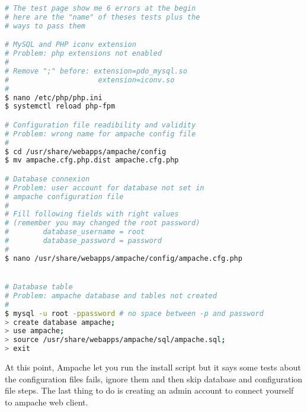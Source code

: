 \begin{lstlisting}[language=bash,caption=Ampache setup]
# The test page show me 6 errors at the begin
# here are the "name" of theses tests plus the 
# ways to pass them

# MySQL and PHP iconv extension
# Problem: php extensions not enabled
#
# Remove ";" before: extension=pdo_mysql.so
#                     extension=iconv.so
#
$ nano /etc/php/php.ini
$ systemctl reload php-fpm

# Configuration file readibility and validity
# Problem: wrong name for ampache config file
#
$ cd /usr/share/webapps/ampache/config
$ mv ampache.cfg.php.dist ampache.cfg.php

# Database connexion
# Problem: user account for database not set in 
# ampache configuration file
#
# Fill following fields with right values
# (remember you may changed the root password)
#        database_username = root
#        database_password = password
#
$ nano /usr/share/webapps/ampache/config/ampache.cfg.php


# Database table
# Problem: ampache database and tables not created
#
$ mysql -u root -ppassword # no space between -p and password
> create database ampache;
> use ampache;
> source /usr/share/webapps/ampache/sql/ampache.sql;
> exit
\end{lstlisting}

At this point, Ampache let you run the install script but it says some tests about 
the configuration files fails, ignore them and then skip database and configuration 
file steps. The last thing to do is creating an admin account to connect yourself 
to ampache web client.

%

